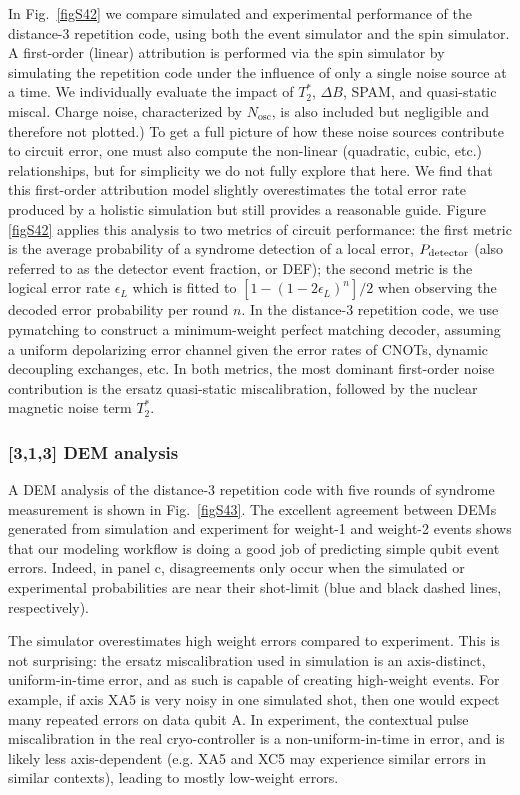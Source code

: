 \documentclass[aps,prl,twocolumn,superscriptaddress,nobibnotes,10pt,floatfix]{revtex4-2}
\newcommand{\figref}[1]{Fig.~\ref{#1}}
\newcommand{\ts}[2]{{#1}_{\textnormal{#2}}}
\begin{document}
In \figref{figS42} we compare simulated and experimental performance of the distance-3 repetition code, using both the event simulator and the spin simulator.
A first-order (linear) attribution is performed via the spin simulator by simulating the repetition code under the influence of only a single noise source at a time.
We individually evaluate the impact of \(T_{2}^{*}\),
\(\Delta B\), SPAM, and quasi-static miscal.
Charge noise, characterized by $N_\text{osc}$, is also included but negligible and therefore not plotted.)
To get a full picture of how these noise sources contribute to circuit error, one must also compute the non-linear (quadratic, cubic, etc.) relationships, but for simplicity we do not fully explore that here.
We find that this first-order attribution model slightly overestimates the total error rate produced by a holistic simulation but still provides a reasonable guide.
Figure \ref{figS42} applies this analysis to two metrics of circuit performance: the first metric is the average probability of a syndrome detection of a local error, $\ts{P}{detector}$ (also referred to as the detector event fraction, or DEF); the second metric is the logical error rate \(\epsilon_{L}\) which is fitted to \([1 - \left( 1 - 2\epsilon_{L} \right)^{n}]/2\) when observing the decoded error probability per round \(n\).
In the distance-3 repetition code, we use pymatching \cite{s_higgott_sparse_2025} to construct a minimum-weight perfect matching decoder, assuming a uniform depolarizing error channel given the error rates of CNOTs, dynamic decoupling exchanges, etc.
In both metrics, the most dominant first-order noise contribution is the ersatz quasi-static miscalibration, followed by the nuclear magnetic noise term \(T_{2}^{*}\).

\subsubsection{{[}3,1,3{]} DEM analysis}\label{dem-analysis-313}

A DEM analysis of the distance-3 repetition code with five rounds of syndrome measurement is shown in \figref{figS43}.
The excellent agreement between DEMs generated from simulation and experiment for weight-1 and weight-2 events shows that our modeling workflow is doing a good job of predicting simple qubit event errors.
Indeed, in panel c, disagreements only occur when the simulated or experimental probabilities are near their shot-limit (blue and black dashed lines, respectively).

The simulator overestimates high weight errors compared to experiment.
This is not surprising: the ersatz miscalibration used in simulation is an axis-distinct, uniform-in-time error, and as such is capable of creating high-weight events.
For example, if axis XA5 is very noisy in one simulated shot, then one would expect many repeated errors on data qubit A.
In experiment, the contextual pulse miscalibration in the real cryo-controller is a non-uniform-in-time in error, and is likely less axis-dependent (e.g. XA5 and XC5 may experience similar errors in similar contexts), leading to mostly low-weight errors.
\end{document}
